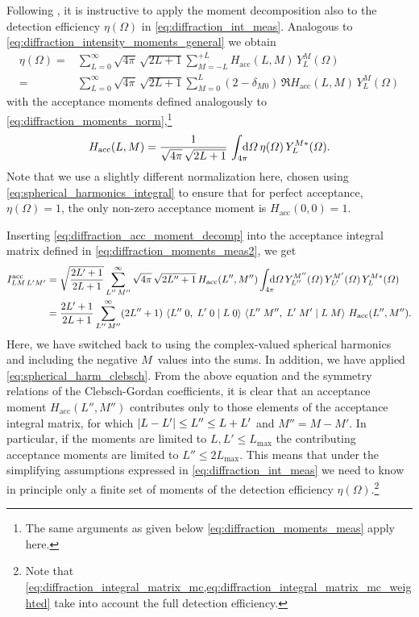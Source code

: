 Following , it is instructive to apply the
moment decomposition also to the detection efficiency $\eta(\Omega)$
in \cref{eq:diffraction_int_meas}.  Analogous to
\cref{eq:diffraction_intensity_moments_general} we obtain
\begin{align}
  \label{eq:diffraction_acc_moment_decomp}
  \eta(\Omega)
  ={}& \sum_{L = 0}^\infty \sqrt{4 \pi}\, \sqrt{2 L + 1} \sum_{M = -L}^{+L} H_\text{acc}(L, M)\, Y_L^M(\Omega)
  \\
  ={}& \sum_{L = 0}^\infty \sqrt{4 \pi}\, \sqrt{2 L + 1} \sum_{M = 0}^{L} (2 - \delta_{M 0})\, \Re{H_\text{acc}(L, M)\, Y_L^M(\Omega)}
\end{align}
with the acceptance moments defined analogously to
\cref{eq:diffraction_moments_norm},\footnote{The same arguments as
given below \cref{eq:diffraction_moments_meas} apply here.} \ie
\begin{equation}
  \label{eq:diffraction_acc_moment}
  H_\text{acc}(L, M)
  = \frac{1}{\sqrt{4 \pi}\, \sqrt{2 L + 1}}\, \int_{4 \pi}\!\!\!\! \dif{\Omega}\, \eta(\Omega)\, Y_L^{M *}(\Omega).
\end{equation}
Note that we use a slightly different normalization here, chosen using
\cref{eq:spherical_harmonics_integral} to ensure that for perfect
acceptance, \ie $\eta(\Omega) = 1$, the only non-zero acceptance
moment is $H_\text{acc}(0, 0) = 1$.%

Inserting \cref{eq:diffraction_acc_moment_decomp} into the acceptance
integral matrix defined in \cref{eq:diffraction_moments_meas2}, we get
\begin{align}
  I^\text{acc}_{L M\, L' M'}
  ={}& \sqrt{\frac{2 L' + 1}{2 L + 1}} \sum_{L''\, M''}^\infty \sqrt{4 \pi}\, \sqrt{2 L'' + 1}\, H_\text{acc}(L'', M'')
  \int_{4 \pi}\!\!\!\! \dif{\Omega}\, Y_{L''}^{M''}(\Omega)\, Y_{L'}^{M'}(\Omega)\, Y_L^{M *}(\Omega) \nonumber
  \\
  \label{eq:diffraction_acc_int_moment_decomp}
  ={}& \frac{2 L' + 1}{2 L + 1} \sum_{L''\, M''}^\infty (2 L'' + 1)\,
  \clebsch{L''}{0}{L'}{0}{L}{0}\, \clebsch{L''}{M''}{L'}{M'}{L}{M}\, H_\text{acc}(L'', M'').
\end{align}
Here, we have switched back to using the complex-valued spherical
harmonics and including the negative $M$~values into the sums.  In
addition, we have applied \cref{eq:spherical_harm_clebsch}.
From the above equation and the symmetry relations of the
Clebsch-Gordan coefficients, it is clear that an acceptance moment
$H_\text{acc}(L'', M'')$ contributes only to those elements of the
acceptance integral matrix, for which $\vert{L - L'}\vert \leq L'' \leq L +
L'$ and $M'' = M - M'$.  In particular, if the moments are limited to
$L, L' \leq L_\text{max}$ the contributing acceptance moments are
limited to $L'' \leq 2 L_\text{max}$.  This means that under the
simplifying assumptions expressed in \cref{eq:diffraction_int_meas} we
need to know in principle only a finite set of moments of the
detection efficiency $\eta(\Omega)$.\footnote{Note that
\cref{eq:diffraction_integral_matrix_mc,eq:diffraction_integral_matrix_mc_weighted}
take into account the full detection efficiency.}



